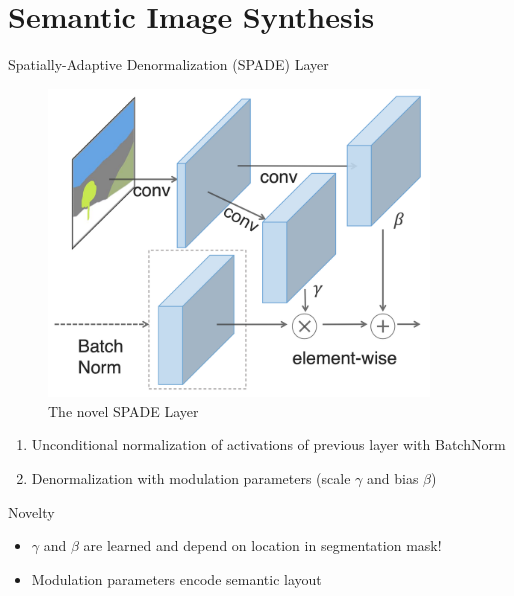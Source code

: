 \documentclass{beamer}
\begin{document}
\section{Semantic Image Synthesis}

\begin{frame}{Spatially-Adaptive Denormalization (SPADE) Layer}
    
        \begin{minipage}[t]{0.5\linewidth}
            \begin{figure}
                \centering
                \includegraphics[width=0.9\textwidth]{figures/spade.png}
                \caption{The novel SPADE Layer}
            \end{figure}
        \end{minipage}
        \hspace{0.5cm}
        \begin{minipage}[t]{0.4\linewidth}
            \vspace{1cm} \begin{enumerate}
                \item Unconditional normalization of activations of previous layer with BatchNorm
                \item Denormalization with modulation parameters (scale $\gamma$ and bias $\beta$)
            \end{enumerate}
            \vfill 
            
        \end{minipage}
    
    \pause
    \begin{block}{Novelty}
        \begin{itemize}
            \item $\gamma$ and $\beta$ are learned and depend on location in segmentation mask!
            \item Modulation parameters encode semantic layout 
        \end{itemize}
    \end{block}
\end{frame}
\end{document}
